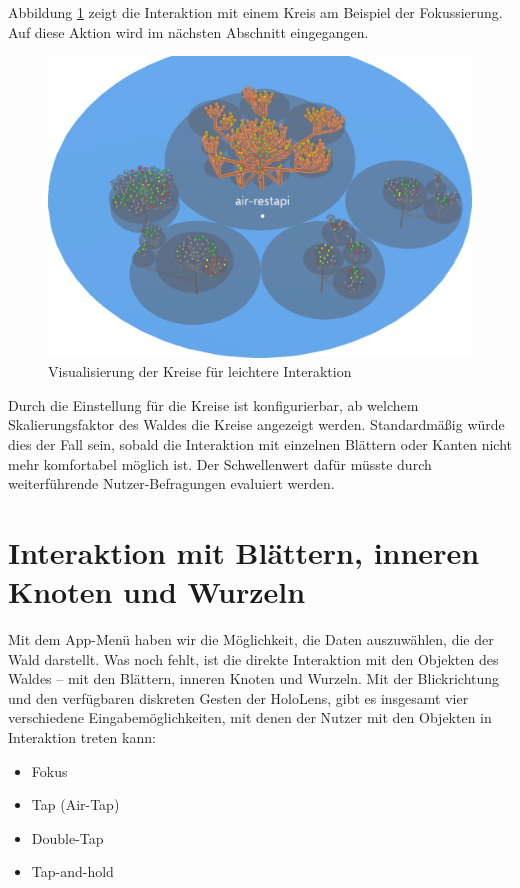 Abbildung \ref{fig:circle-hover} zeigt die Interaktion mit einem Kreis am Beispiel der Fokussierung. Auf diese Aktion wird im nächsten Abschnitt eingegangen.

\begin{figure}[htb]
  \includegraphics[width=.8\textwidth]{figures/circle-hover}
  \caption{Visualisierung der Kreise für leichtere Interaktion}
  \label{fig:circle-hover}
\end{figure}

Durch die Einstellung für die Kreise ist konfigurierbar, ab welchem Skalierungsfaktor des Waldes die Kreise angezeigt werden. Standardmäßig würde dies der Fall sein, sobald die Interaktion mit einzelnen Blättern oder Kanten nicht mehr komfortabel möglich ist. Der Schwellenwert dafür müsste durch weiterführende Nutzer-Befragungen evaluiert werden.

\section{Interaktion mit Blättern, inneren Knoten und Wurzeln}
\label{sec:object-interaction}

Mit dem App-Menü haben wir die Möglichkeit, die Daten auszuwählen, die der Wald darstellt. Was noch fehlt, ist die direkte Interaktion mit den Objekten des Waldes -- mit den Blättern, inneren Knoten und Wurzeln. Mit der Blickrichtung und den verfügbaren diskreten Gesten der HoloLens, gibt es insgesamt vier verschiedene Eingabemöglichkeiten, mit denen der Nutzer mit den Objekten in Interaktion treten kann:

\begin{itemize}
  \item Fokus
  \item Tap (Air-Tap)
  \item Double-Tap
  \item Tap-and-hold
\end{itemize}

